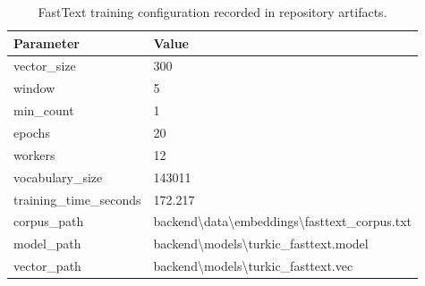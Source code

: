 \begin{table}[ht]
\centering
\caption{FastText training configuration recorded in repository artifacts.}
\label{tab:training\_configuration}
\begin{tabular}{ll}
\hline
Parameter & Value \\
\hline
vector\_size & 300 \\
window & 5 \\
min\_count & 1 \\
epochs & 20 \\
workers & 12 \\
vocabulary\_size & 143011 \\
training\_time\_seconds & 172.217 \\
corpus\_path & backend\textbackslash{}data\textbackslash{}embeddings\textbackslash{}fasttext\_corpus.txt \\
model\_path & backend\textbackslash{}models\textbackslash{}turkic\_fasttext.model \\
vector\_path & backend\textbackslash{}models\textbackslash{}turkic\_fasttext.vec \\
\hline
\end{tabular}
\end{table}
